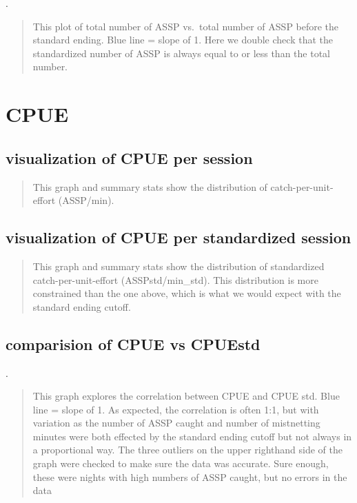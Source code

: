 \documentclass[
]{article}
\begin{document}
.

\begin{quote}
This plot of total number of ASSP vs.~total number of ASSP before the
standard ending. Blue line = slope of 1. Here we double check that the
standardized number of ASSP is always equal to or less than the total
number.
\end{quote}

\hypertarget{cpue}{%
\section{CPUE}\label{cpue}}

\hypertarget{visualization-of-cpue-per-session}{%
\subsection{visualization of CPUE per
session}\label{visualization-of-cpue-per-session}}

\begin{quote}
This graph and summary stats show the distribution of
catch-per-unit-effort (ASSP/min).
\end{quote}

\hypertarget{visualization-of-cpue-per-standardized-session}{%
\subsection{visualization of CPUE per standardized
session}\label{visualization-of-cpue-per-standardized-session}}

\begin{quote}
This graph and summary stats show the distribution of standardized
catch-per-unit-effort (ASSPstd/min\_std). This distribution is more
constrained than the one above, which is what we would expect with the
standard ending cutoff.
\end{quote}

\hypertarget{comparision-of-cpue-vs-cpuestd}{%
\subsection{comparision of CPUE vs
CPUEstd}\label{comparision-of-cpue-vs-cpuestd}}

.

\begin{quote}
This graph explores the correlation between CPUE and CPUE std. Blue line
= slope of 1. As expected, the correlation is often 1:1, but with
variation as the number of ASSP caught and number of mistnetting minutes
were both effected by the standard ending cutoff but not always in a
proportional way. The three outliers on the upper righthand side of the
graph were checked to make sure the data was accurate. Sure enough,
these were nights with high numbers of ASSP caught, but no errors in the
data
\end{quote}
\end{document}
